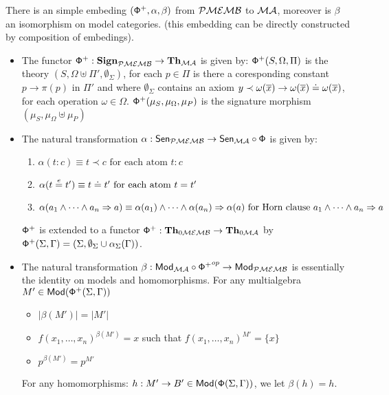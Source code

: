 \documentclass[10pt]{article}
\begin{document}
\begin{fact}  There is an simple embeding $({\sf {\Phi}}^+,\alpha,\beta)$ from ${\mathcal{PMEMB}}$ to ${\mathcal{MA}}$, moreover is $\beta$ an isomorphism on model categories. (this embedding can be directly constructed by composition of embedings).
	\begin{itemize}
		\item The functor ${\sf {\Phi}}^+: {\bf Sign}_{{\mathcal{PMEMB}}} \to {\bf Th}_{{\mathcal{MA}}}$ 
is given by:  ${\sf {\Phi}}^+(S,\Omega,\Pi)$ is the theory $(S,\Omega \uplus \Pi', 
\emptyset_{\Sigma})$, for each $p \in \Pi$ is there a coresponding constant $p \to \pi(p)$ in $\Pi'$ and where $\emptyset_{\Sigma}$ contains an axiom 
$y \prec \omega(\overline{x}) \to \omega(\overline{x}) \mathrel{\dot{=} } \omega(\overline{x})$, for each operation $\omega 
\in \Omega$. ${\sf {\Phi}}^+(\mu_S,\mu_{\Omega},\mu_P)$ is the signature morphism 
$(\mu_S,\mu_{\Omega} \uplus \mu_P)$
	
\item The natural transformation $\alpha: {\sf {Sen}}_{{\mathcal{PMEMB}}} \to 
{\sf {Sen}}_{{\mathcal{MA}}} \circ {\sf {\Phi}}$ is given by:
	\begin{enumerate}
	\item $\alpha(t:c) \equiv t \prec c\mbox{ for each atom }t:c$
	 \item $\alpha(t\stackrel{e}{=} t') \equiv t \mathrel{\dot{=} } t'\mbox{ for each atom }t = t'$
	 \item $\alpha(a_1 \wedge \cdots \wedge a_n \Rightarrow 
a) \equiv \alpha(a_1) \wedge \cdots \wedge \alpha(a_n) \Rightarrow 
\alpha(a)\mbox{ for  Horn clause }a_1 \wedge \cdots \wedge a_n \Rightarrow a$
	\end{enumerate}
${\sf {\Phi}}^+$ is extended to a functor 
${\sf {\Phi}}^+: {\bf Th}_{0{\mathcal{MEMB}}} \to {\bf Th}_{0{\mathcal{MA}}}$ by 
${\sf {\Phi}}^+(\Sigma,\Gamma) = (\Sigma,\emptyset_\Sigma\cup\alpha_\Sigma(\Gamma))$.

%		
\item The natural transformation $\beta: {\sf {Mod}}_{{\mathcal{MA}}} \circ 
{{\sf {\Phi}}^+}^{op} \to {\sf {Mod}}_{{\mathcal{PMEMB}}}$ is essentially the identity on models and homomorphisms.
For any multialgebra $M' \in {\sf {Mod}}({\sf {\Phi}}^+(\Sigma,\Gamma))$
			\begin{itemize}
			\item $|\beta(M')| = |M'|$
			\item $f(x_1, \ldots ,x_n)^{\beta(M')} = x$ such that
			$f(x_1, \ldots ,x_n)^{M'}=\{x\}$
			\item $p^{\beta(M')} = p^{M'}$
			\end{itemize}
For any homomorphisms:  $h: M' \to B' \in {\sf {Mod}}({\sf {\Phi}}(\Sigma,\Gamma))$, we let $\beta(h)=h$.
	\end{itemize}
\end{fact}
\end{document}
